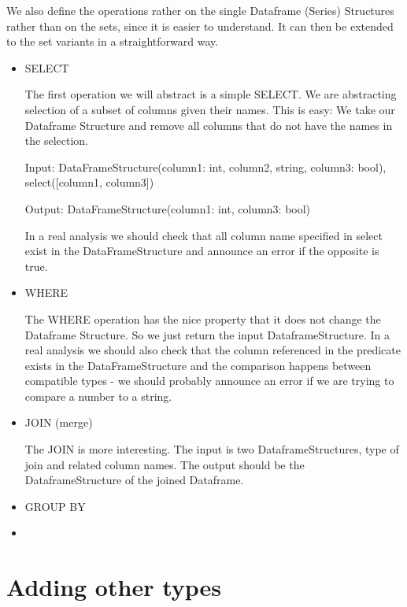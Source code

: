 We also define the operations rather on the single Dataframe (Series) Structures rather than on the sets, since it is
easier to understand.
It can then be extended to the set variants in a straightforward way. 

\begin{itemize}
    \item SELECT

    The first operation we will abstract is a simple SELECT\@.
    We are abstracting selection of a subset of columns given their names.
    This is easy: We take our Dataframe Structure and remove all columns that do not have the names in the selection.
    \begin{example}

        Input: DataFrameStructure(column1: int, column2, string, column3: bool), select([column1, column3])

        Output: DataFrameStructure(column1: int, column3: bool)
    \end{example}
    In a real analysis we should check that all column name specified in select exist in the DataFrameStructure and
    announce an error if the opposite is true.

    \item WHERE

    The WHERE operation has the nice property that it does not change the Dataframe Structure.
    So we just return the input DataframeStructure.
    In a real analysis we should also check that the column referenced in the predicate exists in the DataFrameStructure
    and the comparison happens between compatible types - we should probably announce an error if we are trying to compare
    a number to a string.

    \item JOIN (merge)

    The JOIN is more interesting.
    The input is two DataframeStructures, type of join and related column names.
    The output should be the DataframeStructure of the joined Dataframe.

    \item GROUP BY



    \item {}


\end{itemize}



\section{Adding other types}

